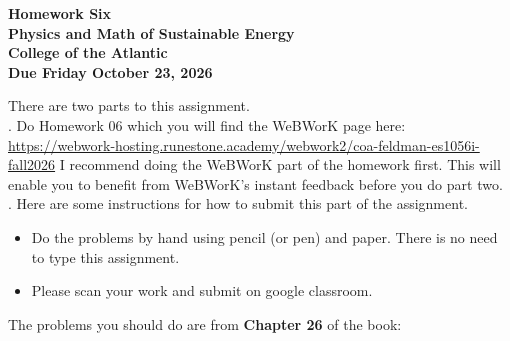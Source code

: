 \documentclass[12pt]{article}
\begin{document}
\pagestyle{empty}
 
\begin{center}
{\LARGE {\bf Homework Six}}\\
\bigskip
{\Large {\bf Physics and Math of Sustainable Energy}}\\
\bigskip
{\Large {\bf College of the Atlantic}}\\
\bigskip
{ {\bf Due Friday October 23, 2026}}\\ 
\end{center}
\medskip


\noindent There are two parts to this assignment.\\

.  Do Homework 06 which you
will find the WeBWorK page here:
\url{https://webwork-hosting.runestone.academy/webwork2/coa-feldman-es1056i-fall2026}
I recommend doing the WeBWorK part of the homework first.  This will
enable you to benefit from WeBWorK's instant feedback before you do part
two.\\ 


.  Here are some
instructions for how to submit this part of the assignment.
\begin{itemize}
\item Do the problems by hand using pencil (or pen) and paper.
  There is no need to type this assignment.

\item Please scan your work and submit on google classroom.\\
  
\end{itemize}

\noindent The problems you should do are from {\bf Chapter
   26} of the book:  \\ 

\end{document}
